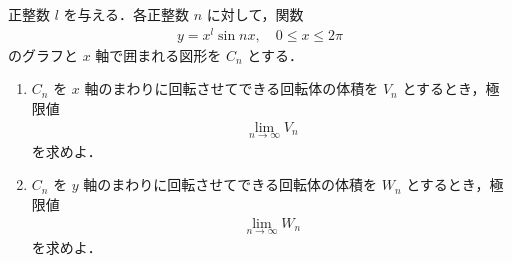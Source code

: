 \documentclass[../../main.tex]{subfiles}
\begin{document}
正整数 $l$ を与える．各正整数 $n$ に対して，関数
\begin{align}
  y = x^l \sin nx, \quad 0 \le x \le 2\pi
\end{align}
のグラフと $x$ 軸で囲まれる図形を $C_n$ とする．
\begin{enumerate}
  \item $C_n$ を $x$ 軸のまわりに回転させてできる回転体の体積を $V_n$ とするとき，極限値
    \begin{align}
      \lim_{n \to \infty} V_n
    \end{align}
    を求めよ．
  \item $C_n$ を $y$ 軸のまわりに回転させてできる回転体の体積を $W_n$ とするとき，極限値
    \begin{align}
      \lim_{n \to \infty} W_n
    \end{align}
    を求めよ．
\end{enumerate}
\end{document}
